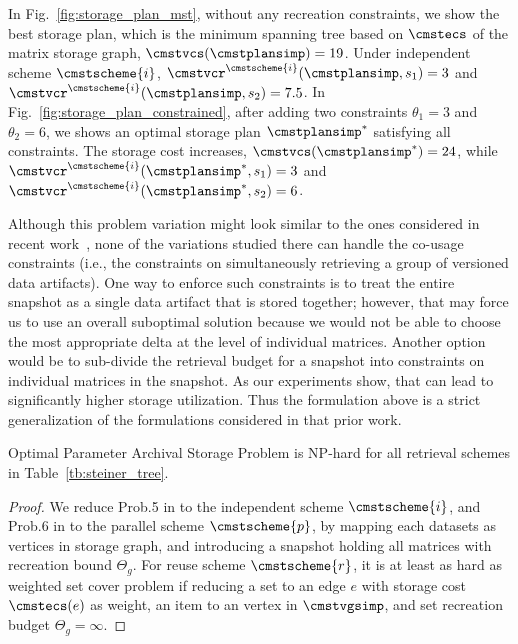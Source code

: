 \documentclass[conference]{IEEEtran}
\begin{document}
\begin{example}
In Fig.~\ref{fig:storage_plan_mst}, without any recreation constraints, we show the best storage plan, which is the minimum spanning tree based on $\cmstecs$ of the matrix storage graph, $\cmstvcs(\cmstplansimp) = 19$. Under independent scheme $\cmstscheme{i}$, $\cmstvcr^{\cmstscheme{i}}(\cmstplansimp, s_1) = 3$ and $\cmstvcr^{\cmstscheme{i}}(\cmstplansimp, s_2) = 7.5$. In Fig.~\ref{fig:storage_plan_constrained}, after adding two constraints $\theta_1 = 3$ and $\theta_2 = 6$, we shows an optimal storage plan $\cmstplansimp^*$ satisfying all constraints. The storage cost increases, $\cmstvcs(\cmstplansimp^*) = 24$, while $\cmstvcr^{\cmstscheme{i}}(\cmstplansimp^*, s_1) = 3$ and $\cmstvcr^{\cmstscheme{i}}(\cmstplansimp^*, s_2) = 6$. 
\end{example}

Although this problem variation might look similar to the ones considered in recent work~\cite{vldb15versioning}, none of the variations 
studied there can handle the co-usage constraints (i.e., the constraints on simultaneously retrieving a group of versioned data artifacts). One 
way to enforce such constraints is to treat the entire snapshot as a single data artifact that is stored together; however, that may force
us to use an overall suboptimal solution because we would not be able to choose the most appropriate delta at the level of individual matrices. 
Another option would be to sub-divide the retrieval budget for a snapshot into constraints on individual matrices in the snapshot. As our
experiments show, that can lead to significantly higher storage utilization. 
Thus the formulation above is a strict generalization of the formulations considered in that prior work. %


\begin{theorem}
Optimal Parameter Archival Storage Problem is NP-hard for all retrieval schemes in Table~\ref{tb:steiner_tree}.
\end{theorem}
\begin{proof}
We reduce Prob.5 in \cite{vldb15versioning} to the independent scheme $\cmstscheme{i}$, and Prob.6 in \cite{vldb15versioning} to the parallel scheme $\cmstscheme{p}$, by mapping each datasets as vertices in storage graph, and introducing a snapshot holding all matrices with recreation bound $\Theta_g$. For reuse scheme $\cmstscheme{r}$, it is at least as hard as weighted set cover problem if reducing a set to an edge $e$ with storage cost $\cmstecs(e)$ as weight, an item to an vertex in $\cmstvgsimp$, and set recreation budget $\Theta_g = \infty$.
\end{proof}
\end{document}
